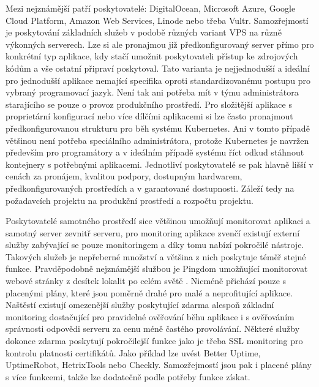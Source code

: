 \begin{itemize}
\begin{itemize}
		Mezi nejznámější patří poskytovatelé: DigitalOcean, Microsoft Azure, Google Cloud Platform, Amazon Web Services,
		Linode nebo třeba Vultr. %
		Samozřejmostí je poskytování základních služeb v podobě různých variant \noindent\Ac{VPS} na různě výkonných serverech.
		Lze si ale pronajmou již předkonfigurovaný server přímo pro konkrétní typ aplikace, kdy stačí umožnit poskytovateli
		přístup ke zdrojových kódům a vše ostatní připraví poskytoval.
		Tato varianta je nejjednodušší a ideální pro jednodušší aplikace nemající specifika oproti standardizovanému postupu
		pro vybraný programovací jazyk.
		Není tak ani potřeba mít v týmu administrátora starajícího se pouze o provoz produkčního prostředí.
		Pro složitější aplikace s proprietární konfigurací nebo více dílčími aplikacemi si lze často pronajmout
		předkonfigurovanou strukturu pro běh systému Kubernetes.
		Ani v tomto případě většinou není potřeba speciálního administrátora, protože Kubernetes je navržen především
		pro programátory a v ideálním případě systému říct odkud stáhnout kontejnery s potřebnými aplikacemi.
		Jednotliví poskytovatelé se pak hlavně lišší v cenách za pronájem, kvalitou podpory, dostupným hardwarem, předkonfigurovaných
		prostředích a v garantované dostupnosti.
		Záleží tedy na požadavcích projektu na produkční prostředí a rozpočtu projektu.

		Poskytovatelé samotného prostředí sice většinou umožňují monitorovat aplikaci a samotný server zevnitř serveru,
		pro monitoring aplikace zvenčí existují externí služby zabývající se pouze monitoringem a díky tomu nabízí pokročilé nástroje.
		Takových služeb je nepřeberné množství a většina z nich poskytuje téměř stejné funkce.
		Pravděpodobně nejznámější službou je Pingdom umožňující monitorovat webové stránky z desítek lokalit po celém
		světě \cite{pingdom}.
		Nicméně přichází pouze s placenými plány, které jsou poměrně drahé pro malé a neprofitující aplikace.
		Naštěstí existují omezenější služby poskytující zdarma alespoň základní monitoring dostačující pro pravidelné
		ověřování běhu aplikace i s ověřováním správnosti odpovědi serveru za cenu méně častého provolávání.
		Některé služby dokonce zdarma poskytují pokročilejší funkce jako je třeba SSL monitoring pro kontrolu
		platnosti certifikátů.
		Jako příklad lze uvést Better Uptime, UptimeRobot, HetrixTools nebo Checkly.
		Samozřejmostí jsou pak i placené plány s více funkcemi, takže lze dodatečně podle potřeby funkce získat.


\end{itemize}
\end{itemize}
